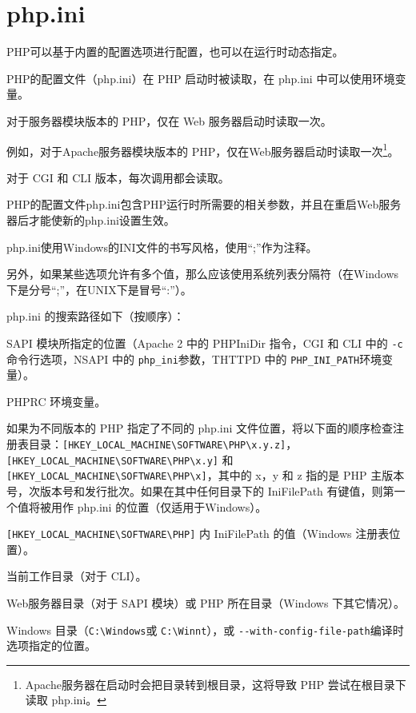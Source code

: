 \section{php.ini}

PHP可以基于内置的配置选项进行配置，也可以在运行时动态指定。

PHP的配置文件（php.ini）在 PHP 启动时被读取，在 php.ini 中可以使用环境变量。

\begin{compactitem}
\item 对于服务器模块版本的 PHP，仅在 Web 服务器启动时读取一次。

例如，对于Apache服务器模块版本的 PHP，仅在Web服务器启动时读取一次\footnote{Apache服务器在启动时会把目录转到根目录，这将导致 PHP 尝试在根目录下读取 php.ini。}。
\item 对于 CGI 和 CLI 版本，每次调用都会读取。
\end{compactitem}


PHP的配置文件php.ini包含PHP运行时所需要的相关参数，并且在重启Web服务器后才能使新的php.ini设置生效。


php.ini使用Windows的INI文件的书写风格，使用“;”作为注释。

另外，如果某些选项允许有多个值，那么应该使用系统列表分隔符（在Windows下是分号“;”，在UNIX下是冒号“:”）。



php.ini 的搜索路径如下（按顺序）：

\begin{compactitem}
\item SAPI 模块所指定的位置（Apache 2 中的 PHPIniDir 指令，CGI 和 CLI 中的 \texttt{-c} 命令行选项，NSAPI 中的 \texttt{php\_ini}参数，THTTPD 中的 \texttt{PHP\_INI\_PATH}环境变量）。
\item PHPRC 环境变量。
\item 如果为不同版本的 PHP 指定了不同的 php.ini 文件位置，将以下面的顺序检查注册表目录：\texttt{[HKEY\_LOCAL\_MACHINE{\textbackslash}SOFTWARE{\textbackslash}PHP{\textbackslash}x.y.z]}，\texttt{[HKEY\_LOCAL\_MACHINE{\textbackslash}SOFTWARE{\textbackslash}PHP{\textbackslash}x.y]} 和 \texttt{[HKEY\_LOCAL\_MACHINE{\textbackslash}SOFTWARE{\textbackslash}PHP{\textbackslash}x]}，其中的 x，y 和 z 指的是 PHP 主版本号，次版本号和发行批次。如果在其中任何目录下的 IniFilePath 有键值，则第一个值将被用作 php.ini 的位置（仅适用于Windows）。
\item \texttt{[HKEY\_LOCAL\_MACHINE{\textbackslash}SOFTWARE{\textbackslash}PHP]} 内 IniFilePath 的值（Windows 注册表位置）。
\item 当前工作目录（对于 CLI）。
\item Web服务器目录（对于 SAPI 模块）或 PHP 所在目录（Windows 下其它情况）。
\item Windows 目录（\texttt{C:{\textbackslash}Windows}或 \texttt{C:{\textbackslash}Winnt}），或 \texttt{-\/-with-config-file-path}编译时选项指定的位置。
\end{compactitem}

